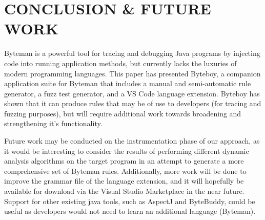 \documentclass[letterpaper,twocolumn,10pt]{article}
\begin{document}
\section{CONCLUSION \& FUTURE WORK}

Byteman is a powerful tool for tracing and debugging Java programs by injecting code into running application methods, but currently lacks the luxuries of modern programming languages. This paper has presented Byteboy, a companion application suite for Byteman that includes a manual and semi-automatic rule generator, a fuzz test generator, and a VS Code language extension. Byteboy has shown that it can produce rules that may be of use to developers (for tracing and fuzzing purposes), but will require additional work towards broadening and strengthening it's functionality.

Future work may be conducted on the instrumentation phase of our approach, as it would be interesting to consider the results of performing different dynamic analysis algorithms on the target program in an attempt to generate a more comprehensive set of Byteman rules. Additionally, more work will be done to improve the grammar file of the language extension, and it will hopefully be available for download via the Visual Studio Marketplace in the near future. Support for other existing java tools, such as AspectJ and ByteBuddy, could be useful as developers would not need to learn an additional language (Byteman).  
\end{document}

